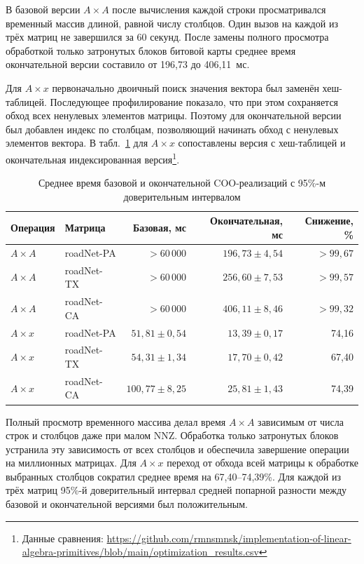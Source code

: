 \documentclass[a4paper]{article}
\begin{document}
В базовой версии $A\times A$ после вычисления каждой строки просматривался временный массив длиной, равной числу столбцов. Один вызов на каждой из трёх матриц не завершился за 60 секунд. После замены полного просмотра обработкой только затронутых блоков битовой карты среднее время окончательной версии составило от 196{,}73 до 406{,}11~мс.

Для $A\times x$ первоначально двоичный поиск значения вектора был заменён хеш-таблицей. Последующее профилирование показало, что при этом сохраняется обход всех ненулевых элементов матрицы. Поэтому для окончательной версии был добавлен индекс по столбцам, позволяющий начинать обход с ненулевых элементов вектора. В табл.~\ref{tab:optimization} для $A\times x$ сопоставлены версия с хеш-таблицей и окончательная индексированная версия\footnote{Данные сравнения: \url{https://github.com/rmnsmnsk/implementation-of-linear-algebra-primitives/blob/main/optimization_results.csv}}.

\begin{table}[H]
\centering\scriptsize
\caption{Среднее время базовой и окончательной COO-реализаций с 95\%-м доверительным интервалом}
\label{tab:optimization}
\begin{tabular}{llrrr}
\toprule
Операция & Матрица & Базовая, мс & Окончательная, мс & Снижение, \%\\
\midrule
$A\times A$ & roadNet-PA & $>60\,000$ & $196{,}73 \pm 4{,}54$ & $>99{,}67$\\
$A\times A$ & roadNet-TX & $>60\,000$ & $256{,}60 \pm 7{,}53$ & $>99{,}57$\\
$A\times A$ & roadNet-CA & $>60\,000$ & $406{,}11 \pm 8{,}46$ & $>99{,}32$\\
$A\times x$ & roadNet-PA & $51{,}81 \pm 0{,}54$ & $13{,}39 \pm 0{,}17$ & 74{,}16\\
$A\times x$ & roadNet-TX & $54{,}31 \pm 1{,}34$ & $17{,}70 \pm 0{,}42$ & 67{,}40\\
$A\times x$ & roadNet-CA & $100{,}77 \pm 8{,}25$ & $25{,}81 \pm 1{,}43$ & 74{,}39\\
\bottomrule
\end{tabular}
\end{table}

Полный просмотр временного массива делал время $A\times A$ зависимым от числа строк и столбцов даже при малом NNZ. Обработка только затронутых блоков устранила эту зависимость от всех столбцов и обеспечила завершение операции на миллионных матрицах. Для $A\times x$ переход от обхода всей матрицы к обработке выбранных столбцов сократил среднее время на 67{,}40--74{,}39\%. Для каждой из трёх матриц 95\%-й доверительный интервал средней попарной разности между базовой и окончательной версиями был положительным.
\end{document}

